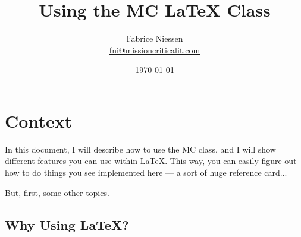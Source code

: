 \documentclass{mcreport}
\title{Using the MC \LaTeX{} Class}
\author{Fabrice Niessen \\ \href{mailto:fni@missioncriticalit.com}{fni@missioncriticalit.com}}
\date{\today}
\begin{document}

\maketitle[caption=Internal documentation]

\newpage


\tableofcontents



\newpage


\section{Context}
\label{sec:context}

In this document, I will describe how to use the \acs{MC} class,
 and I will show
different features you can use within \LaTeX{}. This way, you can easily
figure out how to do things you see implemented here --- a sort of huge
reference card...

But, first, some other topics.

\subsection*{Why Using \LaTeX{}?}
\label{sec:why-choosing-latex}
\end{document}
